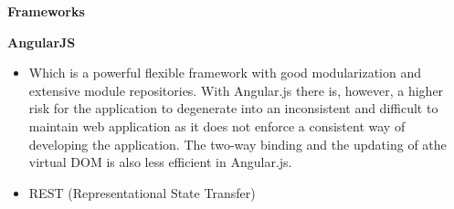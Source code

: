 \documentclass[english]{article}
\begin{document}
			\vspace{0.5cm}
    \newpage
	\textbf{Frameworks} %

	
	\textbf{AngularJS}
	\begin{itemize}
		\item 	Which is a powerful flexible framework with good modularization and extensive module
		repositories. With Angular.js there is, however, a higher risk for the application to degenerate
		into an inconsistent and difficult to maintain web application as it does not enforce a consistent
		way of developing the application. The two-way binding
		and the updating of athe virtual DOM is also less efficient in Angular.js.
		\item REST (Representational State Transfer)

	\end{itemize}
	
	
		
	
\end{document}
